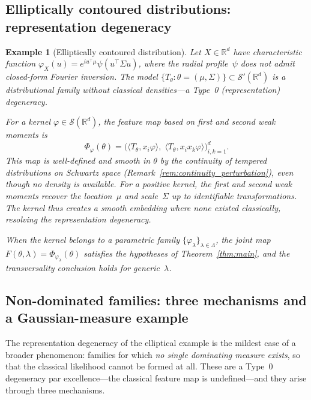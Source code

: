 \documentclass[11pt,a4paper]{article}
\newtheorem{example}[theorem]{Example}
\newcommand{\R}{\mathbb{R}}
\newcommand{\cS}{\mathcal{S}}
\begin{document}
\subsection{Elliptically contoured distributions: representation
  degeneracy}
\label{sec:elliptical}

\begin{example}[Elliptically contoured distribution]
\label{ex:elliptical}
Let $X\in\R^d$ have characteristic function
$\varphi_X(u) = e^{iu^\top\mu}\psi(u^\top\Sigma u)$, where the
radial profile~$\psi$ does not admit closed-form Fourier inversion.
The model $\{T_\theta : \theta = (\mu,\Sigma)\} \subset \cS'(\R^d)$
is a distributional family without classical densities---a Type~0
(representation) degeneracy.

For a kernel $\varphi\in\cS(\R^d)$, the feature map based on first
and second weak moments is
\[
  \Phi_\varphi(\theta)
  = \bigl(\langle T_\theta, x_i\varphi\rangle,\;
    \langle T_\theta, x_i x_k\varphi\rangle\bigr)_{i,k=1}^{d}.
\]
This map is well-defined and smooth in $\theta$ by the continuity of
tempered distributions on Schwartz space
(Remark~\ref{rem:continuity_perturbation}), even though no density is
available.  For a positive kernel, the first and second weak moments
recover the location~$\mu$ and scale~$\Sigma$ up to identifiable
transformations.  The kernel thus \emph{creates} a smooth embedding
where none existed classically, resolving the representation
degeneracy.

When the kernel belongs to a parametric family
$\{\varphi_\lambda\}_{\lambda\in\Lambda}$, the joint map
$F(\theta,\lambda) = \Phi_{\varphi_\lambda}(\theta)$ satisfies the
hypotheses of Theorem~\ref{thm:main}, and the transversality
conclusion holds for generic~$\lambda$.
\end{example}


\subsection{Non-dominated families: three mechanisms and a Gaussian-measure
  example}
\label{sec:nondominated}

The representation degeneracy of the elliptical example is the mildest case of
a broader phenomenon: families for which \emph{no single dominating measure
exists}, so that the classical likelihood cannot be formed at all.  These are a
Type~0 degeneracy par excellence---the classical feature map is undefined---and
they arise through three mechanisms.
\end{document}
